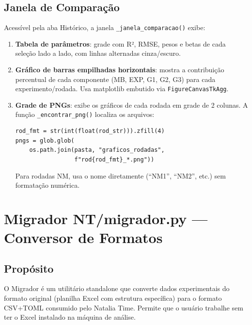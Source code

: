 \documentclass[12pt,a4paper]{report}
\newcommand{\code}[1]{\texttt{#1}}
\begin{document}
\section{Janela de Comparação}

Acessível pela aba Histórico, a janela \code{\_janela\_comparacao()} exibe:

\begin{enumerate}
  \item \textbf{Tabela de parâmetros}: grade com R², RMSE, pesos e betas de
    cada seleção lado a lado, com linhas alternadas cinza/escuro.

  \item \textbf{Gráfico de barras empilhadas horizontais}: mostra a
    contribuição percentual de cada componente (MB, EXP, G1, G2, G3) para
    cada experimento/rodada. Usa matplotlib embutido via
    \code{FigureCanvasTkAgg}.

  \item \textbf{Grade de PNGs}: exibe os gráficos de cada rodada em grade
    de 2 colunas. A função \code{\_encontrar\_png()} localiza os arquivos:
    \begin{lstlisting}[caption={Localização de PNGs por rodada}]
rod_fmt = str(int(float(rod_str))).zfill(4)
pngs = glob.glob(
    os.path.join(pasta, "graficos_rodadas",
                 f"rod{rod_fmt}_*.png"))
    \end{lstlisting}
    Para rodadas NM, usa o nome diretamente (``NM1'', ``NM2'', etc.)
    sem formatação numérica.
\end{enumerate}


\chapter{Migrador NT/migrador.py — Conversor de Formatos}
\label{cap:migrador}

\section{Propósito}

O Migrador é um utilitário standalone que converte dados experimentais do
formato original (planilha Excel com estrutura específica) para o formato
CSV+TOML consumido pelo Natalia Time. Permite que o usuário trabalhe sem
ter o Excel instalado na máquina de análise.
\end{document}
